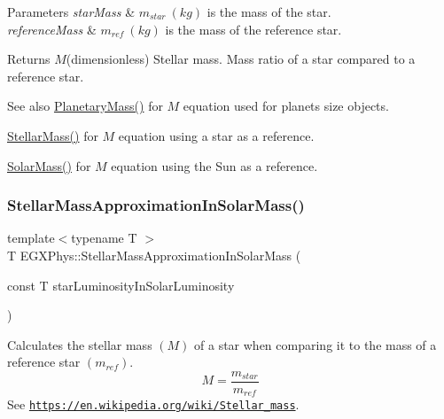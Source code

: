 \begin{DoxyParams}{Parameters}
{\em star\+Mass} & $m_{star}\ (kg)$ is the mass of the star. \\
\hline
{\em reference\+Mass} & $m_{ref}\ (kg)$ is the mass of the reference star. \\
\hline
\end{DoxyParams}
\begin{DoxyReturn}{Returns}
$M$(dimensionless) Stellar mass. Mass ratio of a star compared to a reference star. 
\end{DoxyReturn}
\begin{DoxySeeAlso}{See also}
\mbox{\hyperlink{group___e_g_x_phys-_planetary_mass_ga225bcf56fb37468f6d4d46493d403503}{Planetary\+Mass()}} for $M$ equation used for planets size objects. 

\mbox{\hyperlink{group___e_g_x_phys-_stellar_mass_ga6c1b42cfd62e3174709ddbf15a87b460}{Stellar\+Mass()}} for $M$ equation using a star as a reference. 

\mbox{\hyperlink{group___e_g_x_phys-_stellar_mass_ga4988f903a27ec9cfa63f72b003d876fd}{Solar\+Mass()}} for $M$ equation using the Sun as a reference. 
\end{DoxySeeAlso}
\mbox{\label{group___e_g_x_phys-_stellar_mass_ga8d4792aff66d53698461f73b1d25e3cc}} 
\subsubsection{\texorpdfstring{Stellar\+Mass\+Approximation\+In\+Solar\+Mass()}{StellarMassApproximationInSolarMass()}}
{\footnotesize\ttfamily template$<$typename T $>$ \\
T E\+G\+X\+Phys\+::\+Stellar\+Mass\+Approximation\+In\+Solar\+Mass (\begin{DoxyParamCaption}\item[{const T}]{star\+Luminosity\+In\+Solar\+Luminosity }\end{DoxyParamCaption})}



Calculates the stellar mass $(M)$ of a star when comparing it to the mass of a reference star $(m_{ref})$. \[M=\frac{m_{star}}{m_{ref}}\] See \href{https://en.wikipedia.org/wiki/Stellar_mass}{\tt https\+://en.\+wikipedia.\+org/wiki/\+Stellar\+\_\+mass}. 


